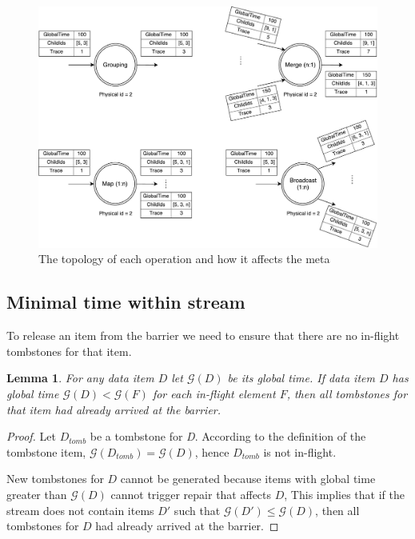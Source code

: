\begin{figure}[ht]
  \centering
  \includegraphics[width=\linewidth]{pics/operations}
  \caption{The topology of each operation and how it affects the meta}
  \label {logical-graph-ops-figure}
\end{figure}

\label{mininal-time}

\subsection{Minimal time within stream}

To release an item from the barrier we need to ensure that there are no in-flight tombstones for that item. 

\newtheorem{minimal-time-claim}{Lemma}

\begin{minimal-time-claim}
For any data item $D$ let $\mathcal{G} (D)$ be its global time. 
  If data item $D$ has global time $\mathcal{G} (D) < \mathcal{G} (F)$ for each in-flight element $F$, 
  then all tombstones for that item had already arrived at the barrier.
\end{minimal-time-claim}

\begin{proof}
  Let $D_{tomb}$ be a tombstone for {\it D}. 
  According to the definition of the tombstone item, $\mathcal{G} (D_{tomb}) = \mathcal{G} (D)$, hence $D_{tomb}$ is not in-flight.
  
  New tombstones for $D$ cannot be generated because items with global time greater than $\mathcal{G} (D)$ cannot trigger repair that affects $D$,
  This implies that if the stream does not contain items $D\prime$ such that $\mathcal{G} (D\prime) \le \mathcal{G} (D)$, then all tombstones for $D$ had already arrived at the barrier. 
\end{proof}

